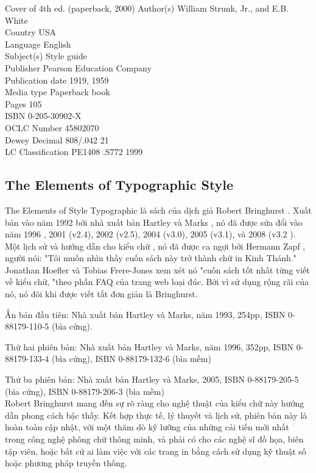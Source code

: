 \documentclass{hcmutarticle}
\begin{document}
Cover of 4th ed. (paperback, 2000)
Author(s)	William Strunk, Jr., and E.B. White\\
Country	USA\\
Language	English\\
Subject(s)	Style guide\\
Publisher	Pearson Education Company\\
Publication date	1919, 1959\\
Media type	Paperback book\\
Pages	105\\
ISBN	0-205-30902-X\\
OCLC Number	45802070\\
Dewey Decimal	808/.042 21\\
LC Classification	PE1408 .S772 1999\\


\subsection{The Elements of Typographic Style}
The Elements of Style Typographic là sách của dịch giả Robert Bringhurst . Xuất bản vào năm 1992 bởi nhà xuất bản Hartley và Marks , nó đã được sửa đổi vào năm 1996 , 2001 (v2.4), 2002 (v2.5), 2004 (v3.0), 2005 (v3.1), và 2008 (v3.2 ). Một lịch sử và hướng dẫn cho kiểu chữ , nó đã được ca ngợi bởi Hermann Zapf , người nói: "Tôi muốn nhìn thấy cuốn sách này trở thành chữ in Kinh Thánh."  Jonathan Hoefler và Tobias Frere-Jones xem xét nó "cuốn sách tốt nhất từng viết về kiểu chữ, "theo phần FAQ của trang web loại đúc. Bởi vì sử dụng rộng rãi của nó, nó đôi khi được viết tắt đơn giản là Bringhurst.

Ấn bản đầu tiên: Nhà xuất bản Hartley và Marks, năm 1993, 254pp, ISBN 0-88179-110-5 (bìa cứng).

Thứ hai phiên bản: Nhà xuất bản Hartley và Marks, năm 1996, 352pp, ISBN 0-88179-133-4 (bìa cứng), ISBN 0-88179-132-6 (bìa mềm)

Thứ ba phiên bản: Nhà xuất bản Hartley và Marks, 2005, ISBN 0-88179-205-5 (bìa cứng), ISBN 0-88179-206-3 (bìa mềm)\\


 Robert Bringhurst mang đến sự  rõ ràng cho nghệ thuật của kiểu chữ này hướng dẫn phong cách bậc thầy. Kết hợp thực tế, lý thuyết và lịch sử, phiên bản này là hoàn toàn cập nhật, với một thăm dò kỹ lưỡng của những cải tiến mới nhất trong công nghệ phông chữ thông minh, và phải có cho các nghệ sĩ đồ họa, biên tập viên, hoặc bất cứ ai làm việc với các trang in bằng cách sử dụng kỹ thuật số hoặc phương pháp truyền thống.
\end{document}
